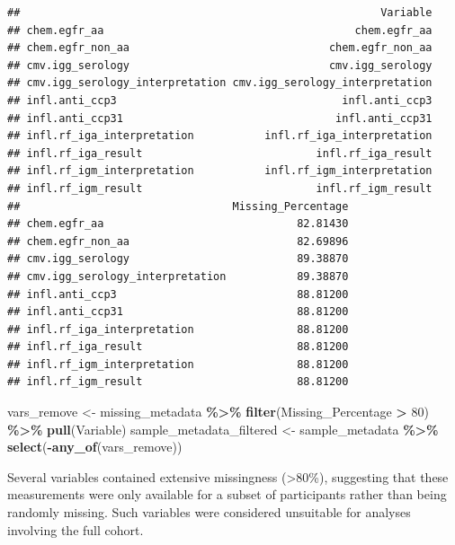 \documentclass[
]{article}
\newenvironment{Shaded}{\begin{snugshade}}{\end{snugshade}}
\newcommand{\DecValTok}[1]{\textcolor[rgb]{0.00,0.00,0.81}{#1}}
\newcommand{\FunctionTok}[1]{\textcolor[rgb]{0.13,0.29,0.53}{\textbf{#1}}}
\newcommand{\NormalTok}[1]{#1}
\newcommand{\OtherTok}[1]{\textcolor[rgb]{0.56,0.35,0.01}{#1}}
\newcommand{\SpecialCharTok}[1]{\textcolor[rgb]{0.81,0.36,0.00}{\textbf{#1}}}
\begin{document}
\begin{verbatim}
##                                                        Variable
## chem.egfr_aa                                       chem.egfr_aa
## chem.egfr_non_aa                               chem.egfr_non_aa
## cmv.igg_serology                               cmv.igg_serology
## cmv.igg_serology_interpretation cmv.igg_serology_interpretation
## infl.anti_ccp3                                   infl.anti_ccp3
## infl.anti_ccp31                                 infl.anti_ccp31
## infl.rf_iga_interpretation           infl.rf_iga_interpretation
## infl.rf_iga_result                           infl.rf_iga_result
## infl.rf_igm_interpretation           infl.rf_igm_interpretation
## infl.rf_igm_result                           infl.rf_igm_result
##                                 Missing_Percentage
## chem.egfr_aa                              82.81430
## chem.egfr_non_aa                          82.69896
## cmv.igg_serology                          89.38870
## cmv.igg_serology_interpretation           89.38870
## infl.anti_ccp3                            88.81200
## infl.anti_ccp31                           88.81200
## infl.rf_iga_interpretation                88.81200
## infl.rf_iga_result                        88.81200
## infl.rf_igm_interpretation                88.81200
## infl.rf_igm_result                        88.81200
\end{verbatim}

\begin{Shaded}
\begin{Highlighting}[]
\NormalTok{vars\_remove }\OtherTok{\textless{}{-}}\NormalTok{ missing\_metadata }\SpecialCharTok{\%\textgreater{}\%}
\FunctionTok{filter}\NormalTok{(Missing\_Percentage }\SpecialCharTok{\textgreater{}} \DecValTok{80}\NormalTok{) }\SpecialCharTok{\%\textgreater{}\%}
\FunctionTok{pull}\NormalTok{(Variable)}
\NormalTok{sample\_metadata\_filtered }\OtherTok{\textless{}{-}}\NormalTok{ sample\_metadata }\SpecialCharTok{\%\textgreater{}\%}
\FunctionTok{select}\NormalTok{(}\SpecialCharTok{{-}}\FunctionTok{any\_of}\NormalTok{(vars\_remove))}
\end{Highlighting}
\end{Shaded}

Several variables contained extensive missingness (\textgreater80\%),
suggesting that these measurements were only available for a subset of
participants rather than being randomly missing. Such variables were
considered unsuitable for analyses involving the full cohort.
\end{document}
